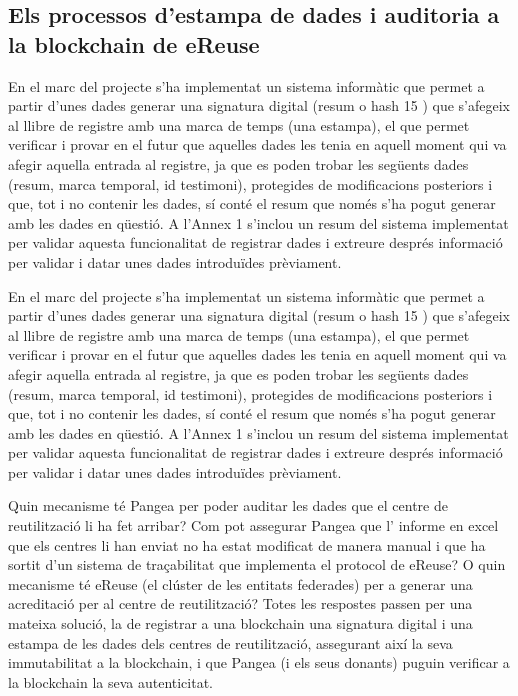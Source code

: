 \documentclass[
]{book}
\begin{document}
\hypertarget{els-processos-destampa-de-dades-i-auditoria-a-la-blockchain-de-ereuse}{%
\subsection{Els processos d'estampa de dades i auditoria a la blockchain de eReuse}\label{els-processos-destampa-de-dades-i-auditoria-a-la-blockchain-de-ereuse}}

En el marc del projecte s'ha implementat un sistema informàtic que permet a partir d'unes dades generar una signatura digital (resum o hash 15 ) que s'afegeix al llibre de registre amb una marca de temps (una estampa), el que permet verificar i provar en el futur que aquelles dades les tenia en aquell moment qui va afegir aquella entrada al registre, ja que es poden trobar les següents dades (resum, marca temporal, id testimoni), protegides de modificacions posteriors i que, tot i no contenir les dades, sí conté el resum que només s'ha pogut generar amb les dades en qüestió. A l'Annex 1 s'inclou un resum del sistema implementat per validar aquesta funcionalitat de registrar dades i extreure després informació per validar i datar unes dades introduïdes prèviament.

En el marc del projecte s'ha implementat un sistema informàtic que permet a partir d'unes dades generar una signatura digital (resum o hash 15 ) que s'afegeix al llibre de registre amb una marca de temps (una estampa), el que permet verificar i provar en el futur que aquelles dades les tenia en aquell moment qui va afegir aquella entrada al registre, ja que es poden trobar les següents dades (resum, marca temporal, id testimoni), protegides de modificacions posteriors i que, tot i no contenir les dades, sí conté el resum que només s'ha pogut generar amb les dades en qüestió. A l'Annex 1 s'inclou un resum del sistema implementat per validar aquesta funcionalitat de registrar dades i extreure després informació per validar i datar unes dades introduïdes prèviament.

Quin mecanisme té Pangea per poder auditar les dades que el centre de reutilització li ha fet arribar? Com pot assegurar Pangea que l' informe en excel que els centres li han enviat no ha estat modificat de manera manual i que ha sortit d'un sistema de traçabilitat que implementa el protocol de eReuse? O quin mecanisme té eReuse (el clúster de les entitats federades) per a generar una acreditació per al centre de reutilització? Totes les respostes passen per una mateixa solució, la de registrar a una blockchain una signatura digital i una estampa de les dades dels centres de reutilització, assegurant així la seva immutabilitat a la blockchain, i que Pangea (i els seus donants) puguin verificar a la blockchain la seva autenticitat.
\end{document}
